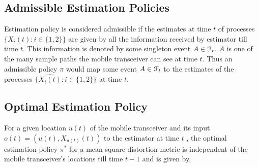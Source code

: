 \documentclass[a4paper,english,12pt]{article}
\begin{document}
\subsection{Admissible Estimation Policies}\label{AEP}
Estimation policy is considered admissible if the estimates at time $t$ of processes $\{X_i(t): i \in \{1,2\}\}$ are given by all the information received by estimator till time $t$. This information is denoted by  some singleton event $A \in \mathcal{F}_t$. $A$ is one of the many sample paths the mobile transceiver can see at time $t$. Thus an admissible policy $\pi$ would map some event $A \in \mathcal{F}_t$ to the estimates of the processes $\{\hat{X_i(t)}: i \in \{1,2\}\}$ at time $t$.
\subsection{Optimal Estimation Policy}
\begin{thm}\label{theta}
For a given location $u(t)$ of the mobile transceiver and its input \\ $o(t)=(u(t), X_{u(t)}(t))$ to the estimator at time $t$ , the optimal estimation policy $\pi^*$ for a mean square distortion metric is independent  of the mobile transceiver's locations till time $t-1$  and is given by,

\end{thm}
\end{document}
